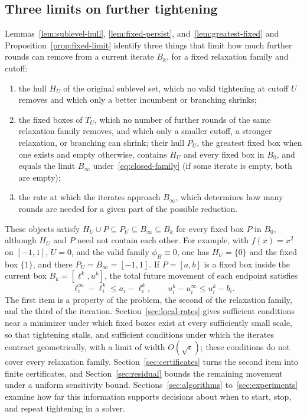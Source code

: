 \subsection{Three limits on further tightening}\label{sec:three-limits}

Lemmas~\ref{lem:sublevel-hull}, \ref{lem:fixed-persist},
and~\ref{lem:greatest-fixed} and Proposition~\ref{prop:fixed-limit}
identify three things that limit how much
further rounds can remove from a current iterate $B_k$, for a fixed
relaxation family and cutoff:
\begin{enumerate}[label=(\roman*)]
\item the hull $H_U$ of the original sublevel set, which no valid tightening
  at cutoff $U$ removes and which only a better incumbent or branching
  shrinks;
\item the fixed boxes of $T_U$, which no number of further rounds of the
  same relaxation family removes, and which only a smaller cutoff, a
  stronger relaxation, or branching can shrink; their hull $P_U$, the
  greatest fixed box when one exists and empty otherwise, contains $H_U$
  and every fixed box in $B_0$, and equals the limit $B_\infty$
  under~\eqref{eq:closed-family} (if some iterate is empty, both are
  empty);
\item the rate at which the iterates approach $B_\infty$, which determines
  how many rounds are needed for a given part of the possible reduction.
\end{enumerate}
These objects satisfy $H_U\cup P\subseteq P_U\subseteq B_\infty\subseteq B_k$
for every fixed box $P$ in $B_0$, although $H_U$ and $P$ need not contain
each other. For example, with $f(x)=x^2$ on $[-1,1]$, $U=0$, and the valid
family $\phi_B\equiv0$, one has $H_U=\{0\}$ and the fixed box $\{1\}$, and
there $P_U=B_\infty=[-1,1]$. If $P=[a,b]$ is a fixed box inside
the current box $B_k=[\ell^k,u^k]$, the total future movement of each
endpoint satisfies
\[
  \ell_i^\infty-\ell_i^k\le a_i-\ell_i^k,\qquad
  u_i^k-u_i^\infty\le u_i^k-b_i.
\]
The first item is a property of the problem, the second of the relaxation
family, and the third of the iteration. Section~\ref{sec:local-rates}
gives sufficient conditions near a minimizer under which fixed boxes exist
at every sufficiently small scale, so that tightening stalls, and
sufficient conditions under which the iterates contract geometrically, with
a limit of width $O(\sqrt\epsilon)$; these conditions do not cover every
relaxation family.
Section~\ref{sec:certificates} turns the second item into finite
certificates, and Section~\ref{sec:residual} bounds the remaining movement
under a uniform sensitivity bound. Sections~\ref{sec:algorithms}
to~\ref{sec:experiments} examine how far this information supports
decisions about when to start, stop, and repeat tightening in a solver.
